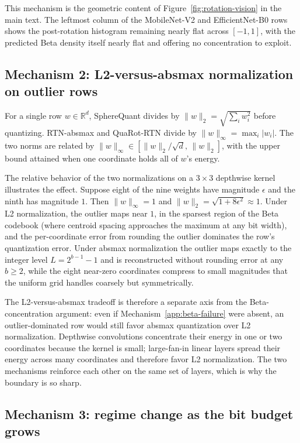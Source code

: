 This mechanism is the geometric content of
Figure~\ref{fig:rotation-vision} in the main text. The leftmost column
of the MobileNet-V2 and EfficientNet-B0 rows shows the post-rotation
histogram remaining nearly flat across $[-1, 1]$, with the predicted
Beta density itself nearly flat and offering no concentration to
exploit.

\subsection{Mechanism 2: L2-versus-absmax normalization on outlier rows}
\label{app:l2-vs-absmax}

For a single row $w \in \mathbb{R}^d$, SphereQuant divides by
$\|w\|_2 = \sqrt{\sum_i w_i^2}$ before quantizing. RTN-absmax and
QuaRot-RTN divide by $\|w\|_\infty = \max_i |w_i|$. The two norms are
related by $\|w\|_\infty \in [\|w\|_2 / \sqrt{d},\, \|w\|_2]$, with the
upper bound attained when one coordinate holds all of $w$'s energy.

The relative behavior of the two normalizations on a $3 \times 3$
depthwise kernel illustrates the effect. Suppose eight of the nine
weights have magnitude $\epsilon$ and the ninth has magnitude $1$. Then
$\|w\|_\infty = 1$ and $\|w\|_2 = \sqrt{1 + 8\epsilon^2} \approx 1$.
Under L2 normalization, the outlier maps near $1$, in the sparsest
region of the Beta codebook (where centroid spacing approaches the
maximum at any bit width), and the per-coordinate error from rounding
the outlier dominates the row's quantization error. Under absmax
normalization the outlier maps exactly to the integer level
$L = 2^{b-1} - 1$ and is reconstructed without rounding error at any
$b \geq 2$, while the eight near-zero coordinates compress to small
magnitudes that the uniform grid handles coarsely but symmetrically.

The L2-versus-absmax tradeoff is therefore a separate axis from the
Beta-concentration argument: even if Mechanism~\ref{app:beta-failure}
were absent, an outlier-dominated row would still favor absmax
quantization over L2 normalization. Depthwise convolutions concentrate
their energy in one or two coordinates because the kernel is small;
large-fan-in linear layers spread their energy across many coordinates
and therefore favor L2 normalization. The two mechanisms reinforce
each other on the same set of layers, which is why the boundary is so
sharp.

\subsection{Mechanism 3: regime change as the bit budget grows}
\label{app:regime-change}

